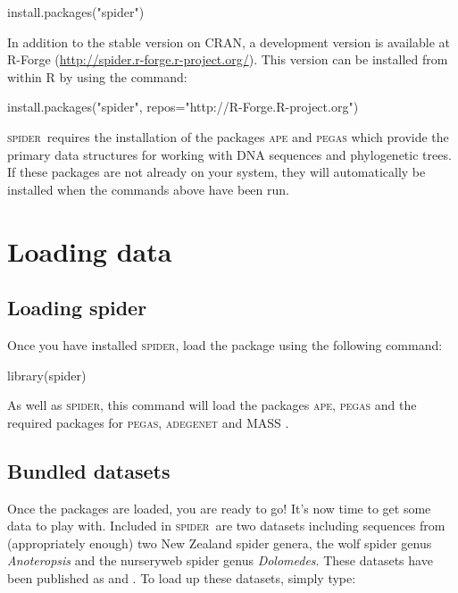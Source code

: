 \documentclass{article}
\newcommand{\spider}{\textsc{spider}~} %
\newcommand{\Spider}{\textsc{spider}} %
\newcommand{\scinm}{\emph}
\newcommand{\progname}[1]{\textsc{#1}}
\begin{document}
\begin{console}
install.packages("spider")
\end{console}

In addition to the stable version on CRAN, a development version is available at R-Forge (\href{http://spider.r-forge.r-project.org/}{http://spider.r-forge.r-project.org/}). This version can be installed from within \progname{R} by using the command:

\begin{console}
install.packages("spider", repos="http://R-Forge.R-project.org")
\end{console}

\spider requires the installation of the packages \progname{ape} \citep{SW.Para.2004.ape} and \progname{pegas} \citep{SW.Para.2010.pegas} which provide the primary data structures for working with DNA sequences and phylogenetic trees. If these packages are not already on your system, they will automatically be installed when the commands above have been run.



\section{Loading data}

\subsection{Loading spider}
Once you have installed \Spider, load the package using the following command: 

\begin{console}
library(spider)
\end{console}

As well as \Spider, this command will load the packages \progname{ape}, \progname{pegas} and the required packages for \progname{pegas}, \progname{adegenet} \citep{Jomb.2008} and \progname{MASS} \citep{Vena.Ripl.2002}.


\subsection{Bundled datasets}
Once the packages are loaded, you are ready to go! It's now time to get some data to play with. Included in \spider are two datasets including sequences from (appropriately enough) two New Zealand spider genera, the wolf spider genus \scinm{Anoteropsis} and the nurseryweb spider genus \scinm{Dolomedes}. These datasets have been published as \citet{Vink.Pate.2003} and \citet{Vink.Dupe.2010}. To load up these datasets, simply type: 
\end{document}
